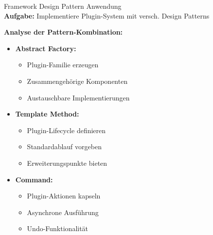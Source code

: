 \begin{example2}{Framework Design Pattern Anwendung}\\
\textbf{Aufgabe:}
Implementiere Plugin-System mit versch. Design Patterns

\textbf{Analyse der Pattern-Kombination:}
\begin{itemize}
    \item \textbf{Abstract Factory:}
    \begin{itemize}
        \item Plugin-Familie erzeugen
        \item Zusammengehörige Komponenten
        \item Austauschbare Implementierungen
    \end{itemize}
    
    \item \textbf{Template Method:}
    \begin{itemize}
        \item Plugin-Lifecycle definieren
        \item Standardablauf vorgeben
        \item Erweiterungspunkte bieten
    \end{itemize}
    
    \item \textbf{Command:}
    \begin{itemize}
        \item Plugin-Aktionen kapseln
        \item Asynchrone Ausführung
        \item Undo-Funktionalität
    \end{itemize}
\end{itemize}
\end{example2}








